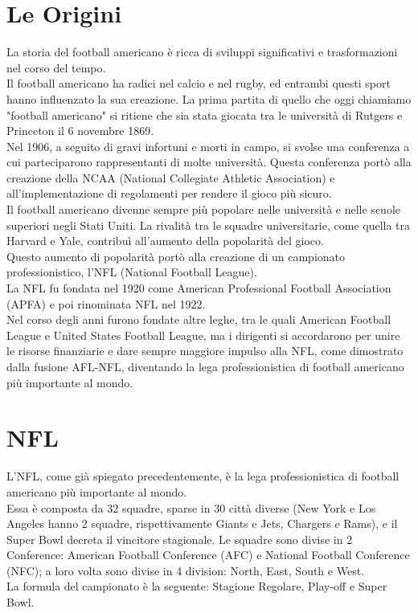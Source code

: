 \documentclass[a4paper, 12pt, oneside]{book}
\begin{document}
	\chapter{Le Origini}
	La storia del football americano è ricca di sviluppi significativi e trasformazioni nel corso del tempo.
	\\Il football americano ha radici nel calcio e nel rugby, ed entrambi questi sport hanno influenzato la sua creazione. La prima partita di quello che oggi chiamiamo "football americano" si ritiene che sia stata giocata tra le università di Rutgers e Princeton il 6 novembre 1869.
	\\Nel 1906, a seguito di gravi infortuni e morti in campo, si svolse una conferenza a cui parteciparono rappresentanti di molte università. Questa conferenza portò alla creazione della NCAA (National Collegiate Athletic Association) e all'implementazione di regolamenti per rendere il gioco più sicuro.
	\\Il football americano divenne sempre più popolare nelle università e nelle scuole superiori negli Stati Uniti. La rivalità tra le squadre universitarie, come quella tra Harvard e Yale, contribuì all'aumento della popolarità del gioco.
	\\Questo aumento di popolarità portò alla creazione di un campionato professionistico, l'NFL (National Football League).
	\\La NFL fu fondata nel 1920 come American Professional Football Association (APFA) e poi rinominata NFL nel 1922.
	\\Nel corso degli anni furono fondate altre leghe, tra le quali American Football League e United States Football League, ma i dirigenti si accordarono per unire le risorse finanziarie e dare sempre maggiore impulso alla NFL, come dimostrato dalla fusione AFL-NFL, diventando la lega professionistica di football americano più importante al mondo.
	
	\chapter{NFL}
	L'NFL, come già spiegato precedentemente, è la lega professionistica di football americano più importante al mondo.
	\\Essa è composta da 32 squadre, sparse in 30 città diverse (New York e Los Angeles hanno 2 squadre, rispettivamente Giants e Jets, Chargers e Rams), e il Super Bowl decreta il vincitore stagionale. Le squadre sono divise in 2 Conference: American Football Conference (AFC) e National Football Conference (NFC); a loro volta sono divise in 4 division: North, East, South e West.
	\\La formula del campionato è la seguente: Stagione Regolare, Play-off e Super Bowl.
	
\end{document}
